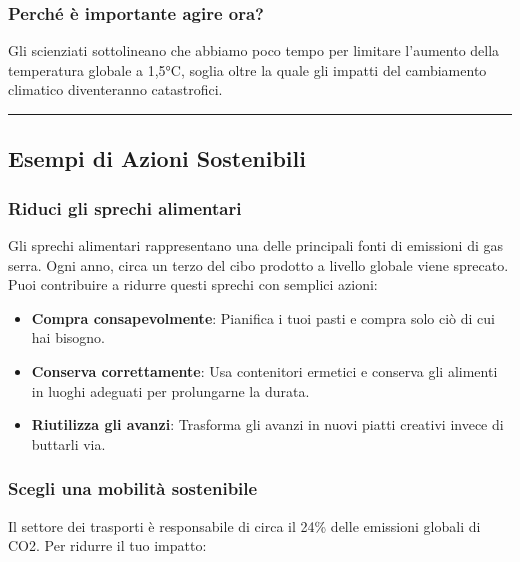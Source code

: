 \documentclass[
]{antposter}
\providecommand{\tightlist}{%
  \setlength{\itemsep}{0pt}\setlength{\parskip}{0pt}}
\begin{document}
\subsubsection{Perché è importante agire
ora?}\label{perchuxe9-uxe8-importante-agire-ora}

Gli scienziati sottolineano che abbiamo poco tempo per limitare
l'aumento della temperatura globale a 1,5°C, soglia oltre la quale gli
impatti del cambiamento climatico diventeranno catastrofici.

\begin{center}\rule{0.5\linewidth}{0.5pt}\end{center}

\subsection{Esempi di Azioni
Sostenibili}\label{esempi-di-azioni-sostenibili}

\subsubsection{Riduci gli sprechi
alimentari}\label{riduci-gli-sprechi-alimentari}

Gli sprechi alimentari rappresentano una delle principali fonti di
emissioni di gas serra. Ogni anno, circa un terzo del cibo prodotto a
livello globale viene sprecato. Puoi contribuire a ridurre questi
sprechi con semplici azioni:

\begin{itemize}
\tightlist
\item
  \textbf{Compra consapevolmente}: Pianifica i tuoi pasti e compra solo
  ciò di cui hai bisogno.
\item
  \textbf{Conserva correttamente}: Usa contenitori ermetici e conserva
  gli alimenti in luoghi adeguati per prolungarne la durata.
\item
  \textbf{Riutilizza gli avanzi}: Trasforma gli avanzi in nuovi piatti
  creativi invece di buttarli via.
\end{itemize}

\subsubsection{Scegli una mobilità
sostenibile}\label{scegli-una-mobilituxe0-sostenibile}

Il settore dei trasporti è responsabile di circa il 24\% delle emissioni
globali di CO2. Per ridurre il tuo impatto:
\end{document}

